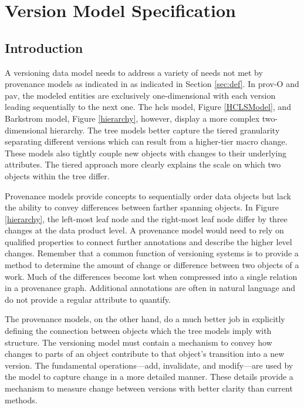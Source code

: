 

\chapter{Version Model Specification}\label{ch:model}

\section{Introduction}

A versioning data model needs to address a variety of needs not met by provenance models as indicated in as indicated in Section \ref{sec:def}.
In \gls{prov}-O and \gls{pav}, the modeled entities are exclusively one-dimensional with each version leading sequentially to the next one.
The \gls{hcls} model, Figure \ref{HCLSModel}, and Barkstrom model, Figure \ref{hierarchy}, however, display a more complex two-dimensional hierarchy.
The tree models better capture the tiered granularity separating different versions which can result from a higher-tier macro change.
These models also tightly couple new objects with changes to their underlying attributes.
The tiered approach more clearly explains the scale on which two objects within the tree differ.

Provenance models provide concepts to sequentially order data objects but lack the ability to convey differences between farther spanning objects.
In Figure \ref{hierarchy}, the left-most leaf node and the right-most leaf node differ by three changes at the data product level.
A provenance model would need to rely on qualified properties to connect further annotations and describe the higher level changes.
Remember that a common function of versioning systems is to provide a method to determine the amount of change or difference between two objects of a work.
Much of the differences become lost when compressed into a single relation in a provenance graph.
Additional annotations are often in natural language and do not provide a regular attribute to quantify.

The provenance models, on the other hand, do a much better job in explicitly defining the connection between objects which the tree models imply with structure.
The versioning model must contain a mechanism to convey how changes to parts of an object contribute to that object's transition into a new version.
The fundamental operations---\gls{add}, \gls{invalidate}, and \gls{modify}---are used by the model to capture change in a more detailed manner.
These details provide a mechanism to measure change between versions with better clarity than current methods.

